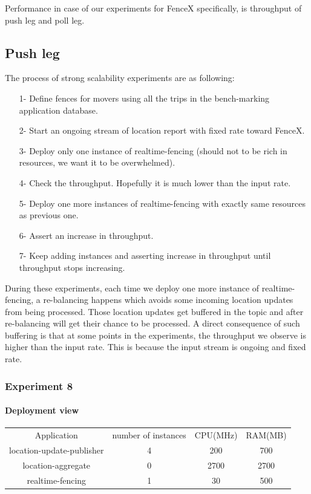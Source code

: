 \documentclass[a4]{report}
\begin{document}
    Performance in case of our experiments for FenceX specifically, is throughput of push leg and poll leg.

    \subsection{Push leg}
    The process of strong scalability experiments are as following:
    \begin{itemize}
        \item[1-] Define fences for movers using all the trips in the bench-marking application database.
        \item[2-] Start an ongoing stream of location report with fixed rate toward FenceX.
        \item[3-] Deploy only one instance of realtime-fencing (should not to be rich in resources, we want it to
        be overwhelmed).
        \item[4-] Check the throughput. Hopefully it is much lower than the input rate.
        \item[5-] Deploy one more instances of realtime-fencing with exactly same resources as previous one.
        \item[6-] Assert an increase in throughput.
        \item[7-] Keep adding instances and asserting increase in throughput until throughput stops increasing.
    \end{itemize}

    During these experiments, each time we deploy one more instance of realtime-fencing, a re-balancing happens which
    avoids some incoming location updates from being processed.
    Those location updates get buffered in the topic and after re-balancing will get their chance to be processed.
    A direct consequence of such buffering is that at some points in the experiments, the throughput we observe is
    higher than the input rate.
    This is because the input stream is ongoing and fixed rate.

    \subsubsection{Experiment 8}

    \paragraph{Deployment view}
    \begin{center}
        \begin{tabular}{ c c c c }
            Application               & number of instances & CPU(MHz) & RAM(MB) \\
            location-update-publisher & 4                   & 200      & 700     \\
            location-aggregate        & 0                   & 2700     & 2700    \\
            realtime-fencing          & 1                   & 30       & 500     \\
        \end{tabular}
    \end{center}
\end{document}
